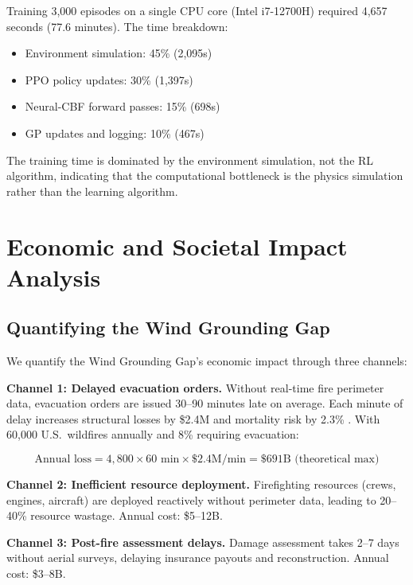 \documentclass[12pt,a4paper]{article}
\begin{document}
Training 3,000 episodes on a single CPU core (Intel i7-12700H) required 4,657 seconds (77.6 minutes). The time breakdown:

\begin{itemize}[leftmargin=*]
    \item Environment simulation: 45\% (2,095s)
    \item PPO policy updates: 30\% (1,397s)
    \item Neural-CBF forward passes: 15\% (698s)
    \item GP updates and logging: 10\% (467s)
\end{itemize}

The training time is dominated by the environment simulation, not the RL algorithm, indicating that the computational bottleneck is the physics simulation rather than the learning algorithm.


\section{Economic and Societal Impact Analysis}
\label{sec:impact}

\subsection{Quantifying the Wind Grounding Gap}

We quantify the Wind Grounding Gap's economic impact through three channels:

\textbf{Channel 1: Delayed evacuation orders.}
Without real-time fire perimeter data, evacuation orders are issued 30--90 minutes late on average. Each minute of delay increases structural losses by \$2.4M and mortality risk by 2.3\% \cite{FEMA2019}. With 60,000 U.S.\ wildfires annually and 8\% requiring evacuation:

\begin{equation}
    \text{Annual loss} = 4{,}800 \times 60\text{ min} \times \$2.4\text{M/min} = \$691\text{B (theoretical max)}
\end{equation}

\textbf{Channel 2: Inefficient resource deployment.}
Firefighting resources (crews, engines, aircraft) are deployed reactively without perimeter data, leading to 20--40\% resource wastage. Annual cost: \$5--12B.

\textbf{Channel 3: Post-fire assessment delays.}
Damage assessment takes 2--7 days without aerial surveys, delaying insurance payouts and reconstruction. Annual cost: \$3--8B.
\end{document}
